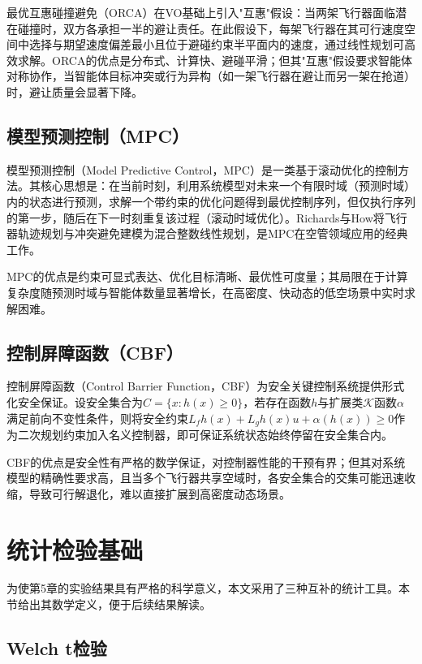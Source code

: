 \documentclass[12pt,a4paper,UTF8]{ctexbook}
\begin{document}
最优互惠碰撞避免（ORCA）\cite{ref4}在VO基础上引入"互惠"假设：当两架飞行器面临潜在碰撞时，双方各承担一半的避让责任。在此假设下，每架飞行器在其可行速度空间中选择与期望速度偏差最小且位于避碰约束半平面内的速度，通过线性规划可高效求解。ORCA的优点是分布式、计算快、避碰平滑；但其"互惠"假设要求智能体对称协作，当智能体目标冲突或行为异构（如一架飞行器在避让而另一架在抢道）时，避让质量会显著下降。

\subsection{模型预测控制（MPC）}

模型预测控制（Model Predictive Control，MPC）是一类基于滚动优化的控制方法。其核心思想是：在当前时刻，利用系统模型对未来一个有限时域（预测时域）内的状态进行预测，求解一个带约束的优化问题得到最优控制序列，但仅执行序列的第一步，随后在下一时刻重复该过程（滚动时域优化）。Richards与How\cite{ref3}将飞行器轨迹规划与冲突避免建模为混合整数线性规划，是MPC在空管领域应用的经典工作。

MPC的优点是约束可显式表达、优化目标清晰、最优性可度量；其局限在于计算复杂度随预测时域与智能体数量显著增长，在高密度、快动态的低空场景中实时求解困难。

\subsection{控制屏障函数（CBF）}

控制屏障函数（Control Barrier Function，CBF）\cite{ref5}为安全关键控制系统提供形式化安全保证。设安全集合为$C=\{x:h(x)\geq0\}$，若存在函数$h$与扩展类$\mathcal{K}$函数$\alpha$满足前向不变性条件，则将安全约束$L_f h(x)+L_g h(x)u+\alpha(h(x))\geq0$作为二次规划约束加入名义控制器，即可保证系统状态始终停留在安全集合内。

CBF的优点是安全性有严格的数学保证，对控制器性能的干预有界；但其对系统模型的精确性要求高，且当多个飞行器共享空域时，各安全集合的交集可能迅速收缩，导致可行解退化，难以直接扩展到高密度动态场景。

\section{统计检验基础}

为使第5章的实验结果具有严格的科学意义，本文采用了三种互补的统计工具。本节给出其数学定义，便于后续结果解读。

\subsection{Welch t检验}
\end{document}
